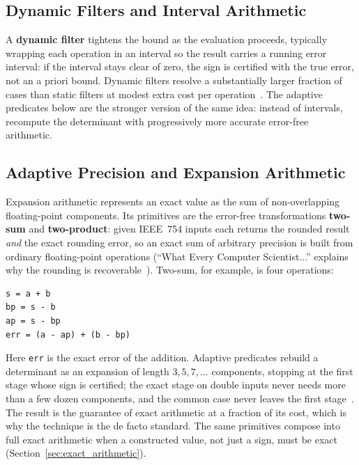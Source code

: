 \subsection{Dynamic Filters and Interval Arithmetic}
\label{sec:appimpl_dynamic}
A \textbf{dynamic filter} tightens the
bound as the evaluation proceeds, typically wrapping each operation in an
interval so the result carries a running error
interval: if the interval stays clear of zero, the sign is certified with
the true error, not an a priori bound. Dynamic filters resolve a
substantially larger fraction of cases than static filters at modest extra
cost per operation~\cite{bronnimann2001}. The adaptive predicates below are
the stronger version of the same idea: instead of intervals, recompute the
determinant with progressively more accurate error-free arithmetic.
\subsection{Adaptive Precision and Expansion Arithmetic}
\label{sec:appimpl_adaptive}
Expansion arithmetic represents an exact value
as the sum of non-overlapping floating-point components. Its primitives are
the error-free transformations \textbf{two-sum} and
\textbf{two-product}: given IEEE~754 inputs each returns
the rounded result \emph{and} the exact rounding error, so an exact sum of
arbitrary precision is built from ordinary floating-point operations
(``What Every Computer Scientist...'' explains why the rounding is
recoverable~\cite{goldberg1991,priest1991}). Two-sum, for example, is four
operations:

\begin{verbatim}
s = a + b
bp = s - b
ap = s - bp
err = (a - ap) + (b - bp)
\end{verbatim}

Here \texttt{err} is the exact error of the addition. Adaptive predicates
rebuild a determinant as an expansion of length $3, 5, 7, \dots$ components,
stopping at the first stage whose sign is certified; the exact stage on
double inputs never needs more than a few dozen components, and the common
case never leaves the first stage~\cite{shewchuk1997}. The result is the
guarantee of exact arithmetic at a fraction of its cost, which is why the
technique is the de facto standard. The same primitives compose into full
exact arithmetic when a constructed value, not just a sign, must be exact
(Section~\ref{sec:exact_arithmetic}).
